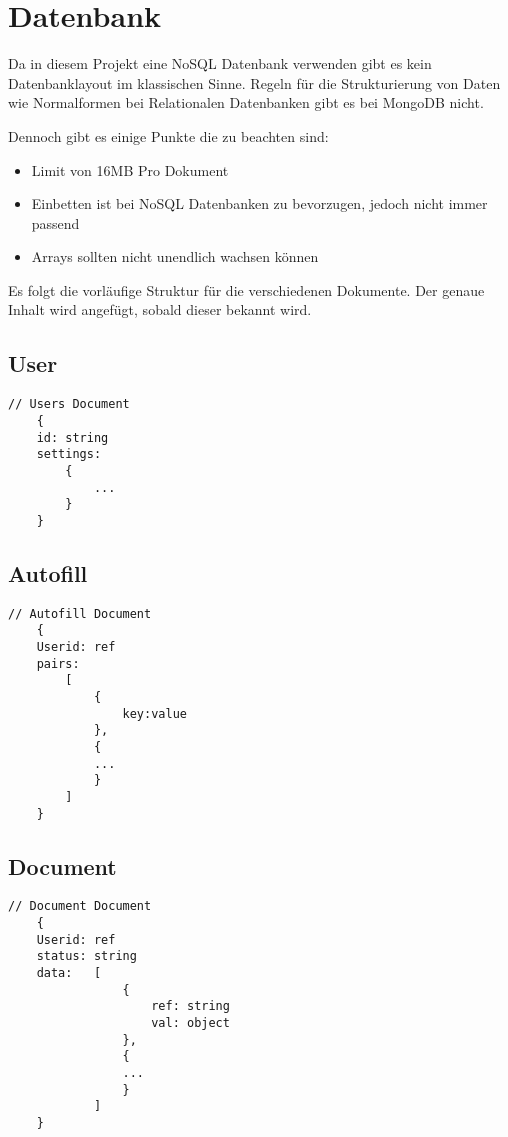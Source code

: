 \chapter{Datenbank}
Da in diesem Projekt eine NoSQL Datenbank verwenden gibt es kein Datenbanklayout im klassischen Sinne.
Regeln für die Strukturierung von Daten wie Normalformen bei Relationalen Datenbanken gibt es bei MongoDB nicht.

Dennoch gibt es einige Punkte die zu beachten sind:
\begin{itemize}
    \item Limit von 16\ac{MB} Pro Dokument
    \item Einbetten ist bei NoSQL Datenbanken zu bevorzugen, jedoch nicht immer passend
    \item Arrays sollten nicht unendlich wachsen können
\end{itemize}

Es folgt die vorläufige Struktur für die verschiedenen Dokumente.
Der genaue Inhalt wird angefügt, sobald dieser bekannt wird.

\section{User}

\begin{lstlisting}[label={lst:lstlistingusers}]
    // Users Document
    {
    id: string
    settings:
        {
            ...
        }
    }

\end{lstlisting}

\section{Autofill}
\begin{lstlisting}[label={lst:lstlistingauto}]
    // Autofill Document
    {
    Userid: ref
    pairs:
        [
            {
                key:value
            },
            {
            ...
            }
        ]
    }

\end{lstlisting}

\section{Document}
\begin{lstlisting}[label={lst:lstlistingdoc}]
    // Document Document
    {
    Userid: ref
    status: string
    data:   [
                {
                    ref: string
                    val: object
                },
                {
                ...
                }
            ]
    }

\end{lstlisting}